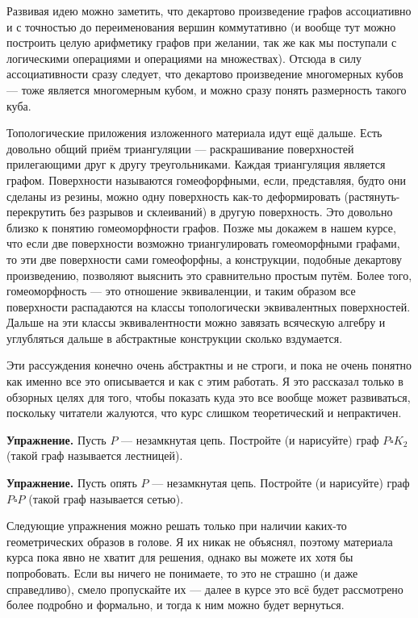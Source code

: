 Развивая идею можно заметить, что декартово произведение графов ассоциативно и с точностью до переименования вершин коммутативно (и вообще тут можно построить целую арифметику графов при желании, так же как мы поступали с логическими операциями и операциями на множествах). Отсюда в силу ассоциативности сразу следует, что декартово произведение многомерных кубов — тоже является многомерным кубом, и можно сразу понять размерность такого куба.

Топологические приложения изложенного материала идут ещё дальше. Есть довольно общий приём триангуляции — раскрашивание поверхностей прилегающими друг к другу треугольниками. Каждая триангуляция является графом. Поверхности называются гомеофорфными, если, представляя, будто они сделаны из резины, можно одну поверхность как-то деформировать (растянуть-перекрутить без разрывов и склеиваний) в другую поверхность. Это довольно близко к понятию гомеоморфности графов. Позже мы докажем в нашем курсе, что если две поверхности возможно триангулировать гомеоморфными графами, то эти две поверхности сами гомеофорфны, а конструкции, подобные декартову произведению, позволяют выяснить это сравнительно простым путём. Более того, гомеоморфность — это отношение эквиваленции, и таким образом все поверхности распадаются на классы топологически эквивалентных поверхностей. Дальше на эти классы эквивалентности можно завязать всяческую алгебру и углубляться дальше в абстрактные конструкции сколько вздумается.

Эти рассуждения конечно очень абстрактны и не строги, и пока не очень понятно как именно все это описывается и как с этим работать. Я это рассказал только в обзорных целях для того, чтобы показать куда это все вообще может развиваться, поскольку читатели жалуются, что курс слишком теоретический и непрактичен.

{\bfseries Упражнение.} Пусть $P$ — незамкнутая цепь. Постройте (и нарисуйте) граф $P\square K_2$ (такой граф называется лестницей).

{\bfseries Упражнение.} Пусть опять $P$ — незамкнутая цепь. Постройте (и нарисуйте) граф $P\square P$ (такой граф называется сетью).

Следующие упражнения можно решать только при наличии каких-то геометрических образов в голове. Я их никак не объяснял, поэтому материала курса пока явно не хватит для решения, однако вы можете их хотя бы попробовать. Если вы ничего не понимаете, то это не страшно (и даже справедливо), смело пропускайте их — далее в курсе это всё будет рассмотрено более подробно и формально, и тогда к ним можно будет вернуться.

